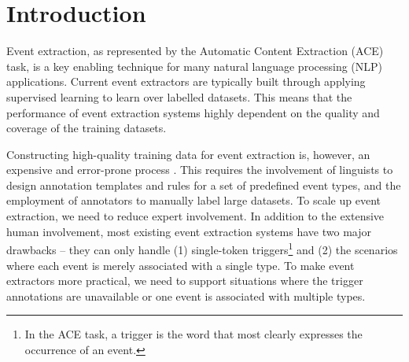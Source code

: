 \section{Introduction}
%

Event extraction, as represented by the Automatic Content Extraction (ACE) task, is a key enabling
technique for many natural language processing (NLP) applications.  Current event extractors are typically built through applying supervised learning to learn over labelled datasets. This means that the performance of event extraction systems highly dependent on the quality and coverage of the training datasets.

Constructing high-quality training data for event extraction is, however, an expensive and error-prone process \cite{aguilar2014comparison,song2015light}. This requires the involvement of linguists to design annotation templates and rules for a set of predefined event types, and the employment of annotators to manually label  large datasets. To scale up event extraction, we need to reduce expert involvement.
In addition to the extensive human involvement, most existing event extraction systems have two major drawbacks -- they can only handle (1)  single-token triggers\footnote{In the ACE task, a trigger is the word that most clearly expresses the occurrence of an event.} and (2) the scenarios where  each event is merely associated with a single type.
To make event extractors more practical, we need to support situations where the trigger annotations are unavailable or one event is associated with multiple types.


